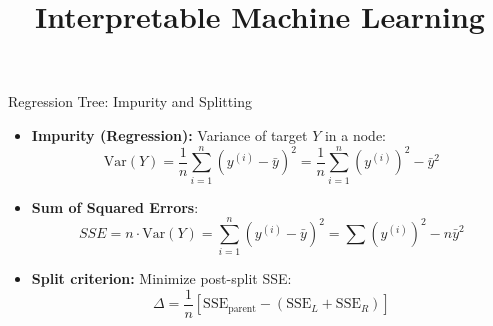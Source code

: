\documentclass[11pt,compress,t,notes=noshow, aspectratio=169, xcolor=table]{beamer}
\title{Interpretable Machine Learning}
\date{}
\begin{document}
\newcommand{\titlefigure}{figure/ebm.jpg}
\newcommand{\learninggoals}{
\item Motivation from GAM
\item Intelligible GAM
\item Accurate GAM + Pairwise Interactions
\item FAST feature interaction detection}


\begin{frame}{Regression Tree: Impurity and Splitting}
  \begin{itemize}
    \item \textbf{Impurity (Regression):} Variance of target $Y$ in a node:
    \[ \text{Var}(Y) = \frac{1}{n}\sum_{i=1}^n (y^{(i)} - \bar{y})^2 = \frac{1}{n} \sum_{i=1}^n (y^{(i)})^2 - \bar{y}^2 \]
    \item \textbf{Sum of Squared Errors}: $$SSE = n \cdot \text{Var}(Y) = \sum_{i=1}^n (y^{(i)} - \bar{y})^2 = \sum (y^{(i)})^2 - n \bar{y}^2 %
    $$
    \item \textbf{Split criterion:} Minimize post-split SSE:
    \[ \Delta = \frac{1}{n} \left[ \text{SSE}_{\text{parent}} - (\text{SSE}_L + \text{SSE}_R) \right] \]
  \end{itemize}
\end{frame}
\end{document}
